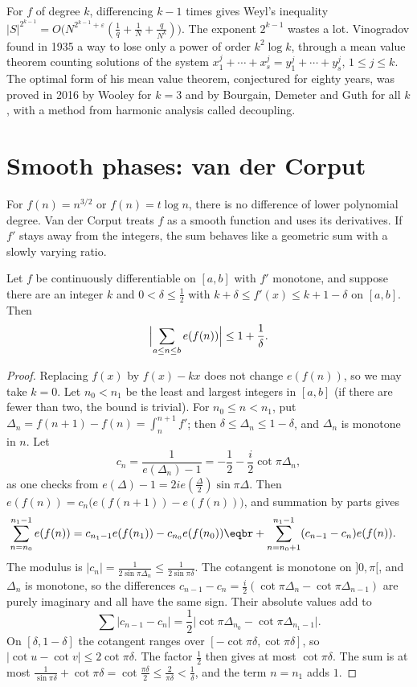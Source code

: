 \begin{remark}
For $f$ of degree $k$, differencing $k-1$ times gives Weyl's inequality $|S|^{2^{k-1}}=O\bigl(N^{2^{k-1}+\varepsilon}(\frac1q+\frac1N+\frac q{N^k})\bigr)$. The exponent $2^{k-1}$ wastes a lot. Vinogradov found in 1935 a way
to lose only a power of order $k^2\log k$, through a mean value theorem counting solutions of the system $x_1^j+\cdots+x_s^j=y_1^j+\cdots+y_s^j$, $1\le j\le k$. The optimal form of his mean value theorem,
conjectured for eighty years, was proved in 2016 by Wooley for $k=3$ and by Bourgain, Demeter and Guth for all $k$, with a method from harmonic analysis called decoupling.
\end{remark}

\section{Smooth phases: van der Corput}

For $f(n)=n^{3/2}$ or $f(n)=t\log n$, there is no difference of lower polynomial degree. Van der Corput treats $f$ as a smooth function and uses its derivatives. If $f'$ stays away from the integers, the sum behaves like a geometric sum with a slowly varying ratio.

\begin{lemma}\label{lem:kl}
Let $f$ be continuously differentiable on $[a,b]$ with $f'$ monotone, and suppose there are an integer $k$ and $0<\delta\le\frac12$ with $k+\delta\le f'(x)\le k+1-\delta$ on $[a,b]$. Then
\[
\Bigl|\sum_{a\le n\le b}e(f(n))\Bigr|\le1+\frac1\delta.
\]
\end{lemma}

\begin{proof}
Replacing $f(x)$ by $f(x)-kx$ does not change $e(f(n))$, so we may take $k=0$. Let $n_0<n_1$ be the least and largest integers in $[a,b]$ (if there are fewer than two, the bound is trivial). For
$n_0\le n<n_1$, put $\Delta_n=f(n+1)-f(n)=\int_n^{n+1}f'$; then $\delta\le\Delta_n\le1-\delta$, and $\Delta_n$ is monotone in $n$. Let
\[
c_n=\frac1{e(\Delta_n)-1}=-\frac12-\frac i2\cot\pi\Delta_n,
\]
as one checks from $e(\Delta)-1=2ie(\frac\Delta2)\sin\pi\Delta$. Then $e(f(n))=c_n\bigl(e(f(n+1))-e(f(n))\bigr)$, and summation by parts gives
\[
\begin{aligned}\sum_{n=n_0}^{n_1-1}e(f(n))&=c_{n_1-1}e(f(n_1))-c_{n_0}e(f(n_0))\eqbr+\sum_{n=n_0+1}^{n_1-1}(c_{n-1}-c_n)e(f(n)).\end{aligned}
\]
The modulus is $|c_n|=\frac1{2\sin\pi\Delta_n}\le\frac1{2\sin\pi\delta}$. The cotangent is monotone on $]0,\pi[$, and $\Delta_n$ is monotone, so the differences $c_{n-1}-c_n=\frac i2(\cot\pi\Delta_n-\cot\pi\Delta_{n-1})$ are purely imaginary and all have the same sign. Their absolute values add to
\[
\sum|c_{n-1}-c_n|=\frac12\bigl|\cot\pi\Delta_{n_0}-\cot\pi\Delta_{n_1-1}\bigr|.
\]
On $[\delta,1-\delta]$ the cotangent ranges over $[-\cot\pi\delta,\cot\pi\delta]$, so $|\cot u-\cot v|\le 2\cot\pi\delta$. The factor $\frac12$ then gives at most $\cot\pi\delta$. The sum is at most $\frac1{\sin\pi\delta}+\cot\pi\delta=\cot\frac{\pi\delta}2\le\frac2{\pi\delta}<\frac1\delta$,
and the term $n=n_1$ adds $1$.
\end{proof}

